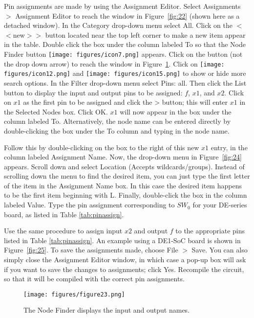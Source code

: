 Pin assignments are made by using the Assignment Editor. 
Select {\sf Assignments $>$ Assignment Editor} to reach the window in Figure~\ref{fig:22}
(shown here as a detached window).
In the {\sf Category} drop-down menu select {\sf All}. Click on the {\sf $<$$<$new$>$$>$} button
located near the top left corner to make a new item appear in the table. Double click the box
under the column labeled To so that the Node Finder button \texttt{[image: figures/icon7.png]}
appears. Click on the button (not the drop down arrow) to reach the window in Figure~\ref{fig:23}. Click on \texttt{[image: figures/icon12.png]} and \texttt{[image: figures/icon15.png]} to show or hide more search options.
In the {\sf Filter} drop-down menu select {\sf Pins: all}. Then click the {\sf List} button to display
the input and output pins to be assigned: $f$, $x1$, and $x2$.
Click on $x1$ as the first pin to be assigned and click the {\sf >} button; this will enter
$x1$ in the Selected Nodes box.  Click {\sf OK}. $x1$ will now appear in the box under the column
labeled To. Alternatively, the node name can be entered directly by double-clicking the box
under the To column and typing in the node name.

Follow this by double-clicking on the box to the right of this new $x1$ entry, in the column
labeled Assignment Name. Now, the drop-down menu in Figure~\ref{fig:24} appears. Scroll down and select 
{\sf Location (Accepts wildcards/groups)}. Instead of scrolling down the menu to find the desired item, 
you can just type the first letter of the item in the Assignment Name box. In this case the desired
item happens to be the first item beginning with L. Finally, double-click the box in the column labeled Value.
Type the pin assignment corresponding to $SW_0$ for your DE-series board, as listed in Table \ref{tab:pinassign}.

Use the same procedure to assign input $x2$ and output $f$ to the appropriate pins listed in
Table \ref{tab:pinassign}. An example using a DE1-SoC board is shown in Figure~\ref{fig:25}.
To save the assignments made, choose {\sf File $>$ Save}. You can also simply close 
the Assignment Editor window, in which case a pop-up box will ask if you want to save
the changes to assignments; click {\sf Yes}.
Recompile the circuit, so that it will be compiled with the correct pin assignments.


\begin{figure}[H]
   \begin{center}
      \texttt{[image: figures/figure23.png]}
   \caption{The Node Finder displays the input and output names.} 
	 \label{fig:23}
	 \end{center}
\end{figure}

